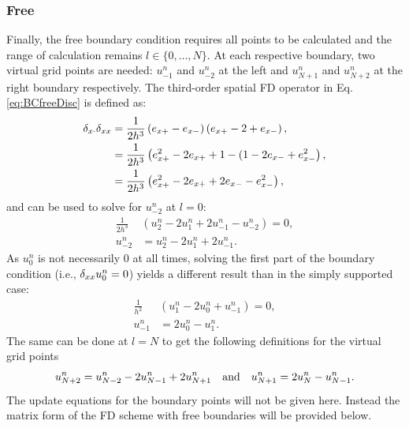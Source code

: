 \subsubsection{Free}
Finally, the free boundary condition requires all points to be calculated and the range of calculation remains $l\in\{0, \hdots, N\}$. At each respective boundary, two virtual grid points are needed: $u_{-1}^n$ and $u_{-2}^n$ at the left and $u_{N+1}^n$ and $u_{N+2}^n$ at the right boundary respectively.
The third-order spatial FD operator in Eq. \eqref{eq:BCfreeDisc} is defined as:
\begin{align}
    \delta_{x\cdot}\delta_{xx} &= \frac{1}{2h^3}\left(e_{x+}-e_{x-}\right)\left(e_{x+}-2+e_{x-}\right),\nonumber\\
    &=\frac{1}{2h^3}\left(e_{x+}^2 - 2e_{x+} + 1 - (1 - 2e_{x-} + e_{x-}^2\right),\nonumber\\
    &=\frac{1}{2h^3}\left(e_{x+}^2 - 2e_{x+} + 2e_{x-} -e_{x-}^2\right),
\end{align}
and can be used to solve for $u_{-2}^n$ at $l=0$:
\begin{align*}
    \frac{1}{2h^3} &\left(u_2^n - 2 u_1^n + 2u_{-1}^n - u_{-2}^n\right) = 0,\\%
    u_{-2}^n &= u_2^n - 2 u_1^n + 2u_{-1}^n.
\end{align*}
As $u_0^n$ is not necessarily $0$ at all times, solving the first part of the boundary condition (i.e., $\delta_{xx} u_0^n = 0$) yields a different result than in the simply supported case:
\begin{align*}
    \frac{1}{h^2} &\left(u_1^n - 2 u_0^n + u_{-1}^n \right) = 0,\\
    u_{-1}^n &= 2u_0^n - u_1^n.
\end{align*}
The same can be done at $l=N$ to get the following definitions for the virtual grid points
\begin{equation*}
    u_{N+2}^n = u_{N-2}^n - 2 u_{N-1}^n + 2u_{N+1}^n
    \quad \text{and} \quad u_{N+1}^n = 2u_N^n - u_{N-1}^n.
\end{equation*}
The update equations for the boundary points will not be given here. Instead the matrix form of the FD scheme with free boundaries will be provided below. 
